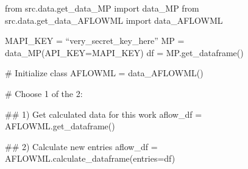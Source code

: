 from src.data.get_data_MP import data_MP
from src.data.get_data_AFLOWML import data_AFLOWML

MAPI_KEY = ``very_secret_key_here''
MP = data_MP(API_KEY=MAPI_KEY)
df = MP.get_dataframe()

# Initialize class
AFLOWML = data_AFLOWML()

# Choose 1 of the 2:

## 1) Get calculated data for this work
aflow_df = AFLOWML.get_dataframe()

## 2) Calculate new entries
aflow_df = AFLOWML.calculate_dataframe(entries=df)

